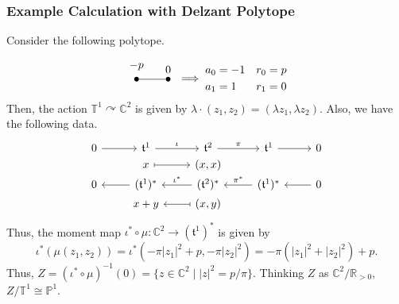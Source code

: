 \documentclass[b5paper,final]{article}
\newcommand{\acton}{\curvearrowright}
\begin{document}
\subsubsection*{Example Calculation with Delzant Polytope}

\begin{example}{}
    Consider the following polytope.
    \begin{equation*}
        \begin{tikzpicture}[every node/.style={circle,fill=black,minimum width=1.5pt,inner sep=1.5pt}]
            \node[label={$-p$}] (A) at (0,0) {};
            \node[label={$0$}] (B) at (1,0) {};
            \draw (A) -- (B);
        \end{tikzpicture}
        \implies
        \begin{aligned}
            a_0 &= -1 & r_0 &= p \\
            a_1 &= 1 & r_1 &= 0
        \end{aligned}
    \end{equation*}
    Then, the action $\mathbb{T}^1 \acton \mathbb{C}^2$ is given by $\lambda \cdot (z_1, z_2) = (\lambda z_1, \lambda z_2)$. Also, we have the following data.
    \begin{equation*}
        \begin{tikzcd}[row sep=0ex]
            0 \arrow[r] & \mathfrak{t}^1 \arrow[r, "\iota"] & \mathfrak{t}^2 \arrow[r, "\pi"] & \mathfrak{t}^1 \arrow[r] & 0 \\
            {} & x \arrow[r, maps to] & (x, x) & {} & {} \\
            0 & (\mathfrak{t}^1)^* \arrow[l] & (\mathfrak{t}^2)^* \arrow[l, "\iota^*"'] & (\mathfrak{t}^1)^* \arrow[l, "\pi^*"'] & 0 \arrow[l] \\
            {} & x+y & (x, y) \arrow[l, maps to] & {} & {}
        \end{tikzcd}
    \end{equation*}
    Thus, the moment map $\iota^* \circ \mu : \mathbb{C}^2 \to (\mathfrak{t}^1)^*$ is given by
    \begin{equation*}
        \iota^*(\mu(z_1, z_2)) = \iota^*(-\pi|z_1|^2+p, -\pi|z_2|^2) = -\pi(|z_1|^2+|z_2|^2) + p.
    \end{equation*}
    Thus, $Z = (\iota^* \circ \mu)^{-1}(0) = \{ z \in \mathbb{C}^2 \mid |z|^2 = p/\pi \}$. Thinking $Z$ as $\mathbb{C}^2 / \mathbb{R}_{>0}$, $Z/\mathbb{T}^1 \cong \mathbb{P}^1$.
\end{example}
\end{document}
